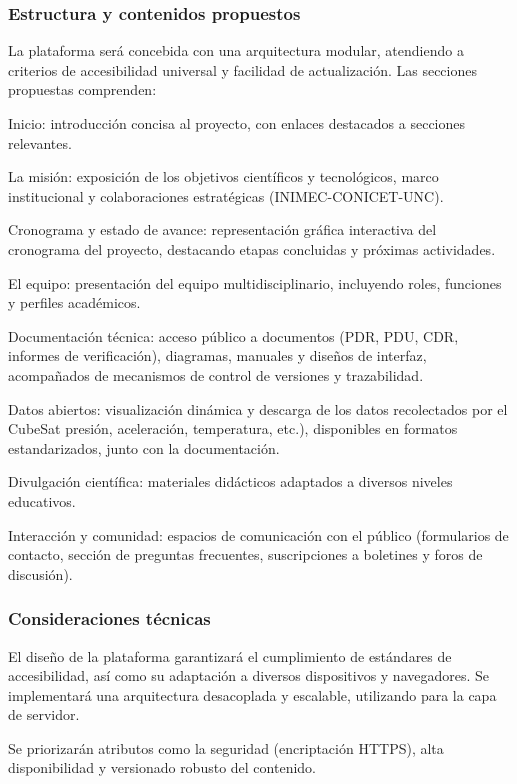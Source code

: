     \subsubsection{Estructura y contenidos propuestos}

    La plataforma será concebida con una arquitectura modular, atendiendo a criterios de
    accesibilidad universal y facilidad de actualización. Las secciones propuestas
    comprenden:

    Inicio: introducción concisa al proyecto, con enlaces destacados a secciones relevantes.

    La misión: exposición de los objetivos científicos y tecnológicos, marco institucional y
    colaboraciones estratégicas (INIMEC-CONICET-UNC).

    Cronograma y estado de avance: representación gráfica interactiva del cronograma del proyecto,
    destacando etapas concluidas y próximas actividades.

    El equipo: presentación del equipo multidisciplinario, incluyendo roles, funciones y perfiles
    académicos.

    Documentación técnica: acceso público a documentos (PDR, PDU, CDR, informes de verificación),
    diagramas, manuales y diseños de interfaz, acompañados de mecanismos de control de versiones y trazabilidad.

    Datos abiertos: visualización dinámica y descarga de los datos recolectados por el CubeSat 
    presión, aceleración, temperatura, etc.), disponibles en formatos estandarizados, junto con la
    documentación.

    Divulgación científica: materiales didácticos adaptados a diversos niveles
    educativos.

    Interacción y comunidad: espacios de comunicación con el público (formularios de contacto,
    sección de preguntas frecuentes, suscripciones a boletines y foros de discusión).

      \subsubsection{Consideraciones técnicas}

    El diseño de la plataforma garantizará el cumplimiento de estándares de accesibilidad, así como
    su adaptación a diversos dispositivos y navegadores. Se implementará una arquitectura desacoplada
    y escalable, utilizando para la capa de servidor.

    Se priorizarán atributos como la seguridad (encriptación HTTPS), alta disponibilidad y versionado
    robusto del contenido.


